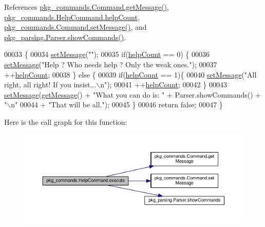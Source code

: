 References \hyperlink{Command_8java_source_l00097}{pkg\-\_\-commands.\-Command.\-get\-Message()}, \hyperlink{HelpCommand_8java_source_l00018}{pkg\-\_\-commands.\-Help\-Command.\-help\-Count}, \hyperlink{Command_8java_source_l00089}{pkg\-\_\-commands.\-Command.\-set\-Message()}, and \hyperlink{Parser_8java_source_l00059}{pkg\-\_\-parsing.\-Parser.\-show\-Commands()}.


\begin{DoxyCode}
00033                                           \{
00034         \hyperlink{classpkg__commands_1_1Command_ae210ff216fe908b111ba1c988a963d13}{setMessage}(\textcolor{stringliteral}{""});
00035         \textcolor{keywordflow}{if}(\hyperlink{classpkg__commands_1_1HelpCommand_a1f83dd0f92e63803f29ce29485903526}{helpCount} == 0) \{
00036             \hyperlink{classpkg__commands_1_1Command_ae210ff216fe908b111ba1c988a963d13}{setMessage}(\textcolor{stringliteral}{"Help ? Who needs help ? Only the weak ones."});
00037             ++\hyperlink{classpkg__commands_1_1HelpCommand_a1f83dd0f92e63803f29ce29485903526}{helpCount};
00038         \} \textcolor{keywordflow}{else} \{
00039             \textcolor{keywordflow}{if}(\hyperlink{classpkg__commands_1_1HelpCommand_a1f83dd0f92e63803f29ce29485903526}{helpCount} == 1)\{
00040                 \hyperlink{classpkg__commands_1_1Command_ae210ff216fe908b111ba1c988a963d13}{setMessage}(\textcolor{stringliteral}{"All right, all right! If you insist...\(\backslash\)n"});
00041                 ++\hyperlink{classpkg__commands_1_1HelpCommand_a1f83dd0f92e63803f29ce29485903526}{helpCount};
00042             \}
00043             \hyperlink{classpkg__commands_1_1Command_ae210ff216fe908b111ba1c988a963d13}{setMessage}(\hyperlink{classpkg__commands_1_1Command_ac2a42e2bab264821892daefaf9a18b6c}{getMessage}() + \textcolor{stringliteral}{"What you can do is: "} + Parser.showCommands() + \textcolor{stringliteral}{
      "\(\backslash\)n"}
00044                     + \textcolor{stringliteral}{"That will be all."});
00045         \}
00046         \textcolor{keywordflow}{return} \textcolor{keyword}{false};
00047     \}
\end{DoxyCode}


Here is the call graph for this function\-:
\nopagebreak
\begin{figure}[H]
\begin{center}
\leavevmode
\includegraphics[width=350pt]{classpkg__commands_1_1HelpCommand_a332d3e57539dfc82f8c539f8b3e24dd6_cgraph}
\end{center}
\end{figure}




